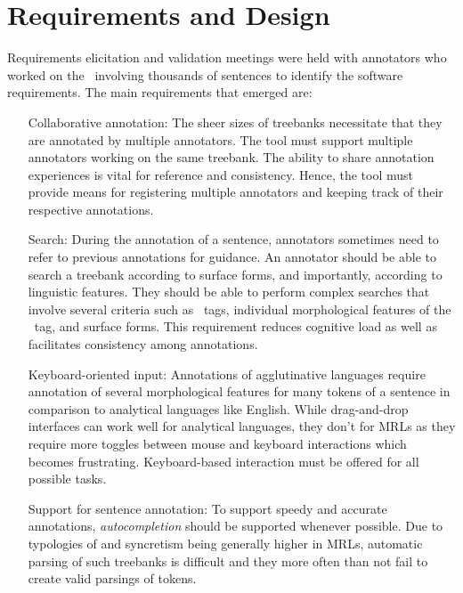 \section{Requirements and Design}
\label{sec:requirements}

Requirements elicitation and validation meetings were held with annotators who worked on the \bountreebank\ involving thousands of sentences to identify the software requirements.
The main requirements that emerged are:
\begin{itemize}[before=\normalfont, font=\itshape, align=left,noitemsep,topsep=0pt,parsep=3pt,partopsep=0pt,labelsep=3pt,align=left]
    \item[Collaborative annotation:]
        The sheer sizes of treebanks necessitate that they are annotated by multiple annotators.
        The tool must support multiple annotators working on the same treebank.
        The ability to share annotation experiences is vital for reference and consistency.
        Hence, the tool must provide means for registering multiple annotators and keeping track of their respective annotations.
    \item[Search:]
        During the annotation of a sentence, annotators sometimes need to refer to previous annotations for guidance.
        An annotator should be able to search a treebank according to surface forms, and importantly, according to linguistic features.
        They should be able to perform complex searches that involve several criteria such as \ud\ tags, individual morphological features of the \feats\ tag, and surface forms.
        This requirement reduces cognitive load as well as facilitates consistency among annotations.
    \item[Keyboard-oriented input:]
        Annotations of agglutinative languages require annotation of several morphological features for many tokens of a sentence in comparison to analytical languages like English.
        While drag-and-drop interfaces can work well for analytical languages, they don't for MRLs as they require more toggles between mouse and keyboard interactions which becomes frustrating.
        Keyboard-based interaction must be offered for all possible tasks.
    \item[Support for sentence annotation:]
        To support speedy and accurate annotations, \textit{autocompletion} should be supported whenever possible.
        Due to typologies of and syncretism being generally higher in MRLs, automatic parsing of such treebanks is difficult and they more often than not fail to create valid parsings of tokens.

\end{itemize}
